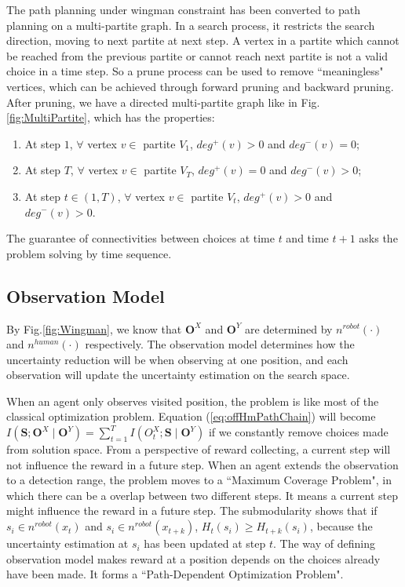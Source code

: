 \documentclass[12pt]{article}
\begin{document}
The path planning under wingman constraint has been converted to path planning on a multi-partite graph. In a search process, it restricts the search direction, moving to next partite at next step. A vertex in a partite which cannot be reached from the previous partite or cannot reach next
partite is not a valid choice in a time step. So a prune process can be used to remove ``meaningless" vertices, which can be achieved through forward
pruning and backward pruning. After pruning, we have a directed multi-partite graph like in Fig.\ref{fig:MultiPartite}, which has the properties:
\begin{enumerate}
\item At step $ 1 $, $ \forall $ vertex $ v \in $ partite $ V_{1} $, $ deg^{+}(v) > 0 $ and $ deg^{-}(v) = 0 $;
\item At step $ T $, $ \forall $ vertex $ v \in $ partite $ V_{T} $, $ deg^{+}(v) = 0 $ and $ deg^{-}(v) > 0 $;
\item At step $ t \in (1, T) $, $ \forall $ vertex $ v \in $ partite $ V_{t} $, $ deg^{+}(v) > 0 $ and $ deg^{-}(v) > 0 $.
\end{enumerate}

The guarantee of connectivities between choices at time $ t $ and time $ t+1 $ asks the problem solving by time sequence.

\subsection{Observation Model}

By Fig.\ref{fig:Wingman}, we know that $ \textbf{O}^{X} $ and $ \textbf{O}^{Y} $ are determined by  $ n^{robot}(\cdot) $ and  $ n^{human}(\cdot) $ respectively. The observation model determines how the uncertainty reduction will be when observing at one position, and each observation will update the uncertainty estimation on the search space. 

When an agent only observes visited position, the problem is like most of the classical optimization problem. Equation (\ref{eq:offHmPathChain}) will become $ I(\textbf{S}; \textbf{O}^{X} \mid \textbf{O}^{Y}) = \sum_{t=1}^{T} I(O^{X}_{t} ; \textbf{S} \mid \textbf{O}^{Y})  $ if we constantly remove choices made from solution space. From a perspective of reward collecting, a current step will not influence the reward in a future step. When an agent extends the observation to a detection range, the problem moves to a ``Maximum Coverage Problem", in which there can be a overlap between two different steps. It means a current step might influence the reward in a future step. The submodularity shows that if $ s_{i} \in  n^{robot}(x_{t}) $ and $ s_{i} \in  n^{robot}(x_{t+k}) $, $ H_{t}(s_{i}) \geq H_{t+k}(s_{i}) $, because the uncertainty estimation at $ s_{i} $ has been updated at step $ t $. The way of defining observation model makes reward at a position depends on the choices already have been made. It forms a ``Path-Dependent Optimization Problem".
\end{document}
